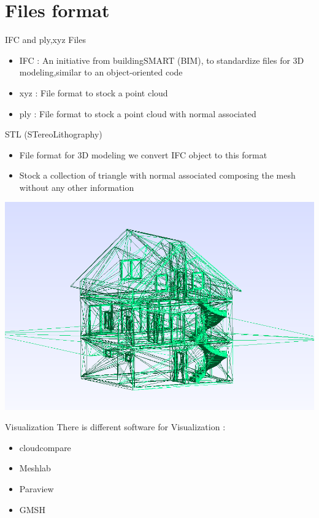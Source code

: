 \documentclass[10pt]{beamer}
\begin{document}
\section{Files format}
\begin{frame}{IFC and ply,xyz Files}
\begin{itemize}
    \item IFC : An initiative from buildingSMART (BIM), to standardize files for 3D modeling,similar to  an object-oriented code 
    \item xyz : File format to stock a point cloud
    \item ply : File format to stock a point cloud with normal associated
\end{itemize}


\end{frame}
\begin{frame}{STL (STereoLithography)}
    \begin{itemize}
        \item File format for 3D modeling we convert IFC object to this format
        \item Stock a collection of triangle with normal associated composing  the mesh without any other information
    \end{itemize}
    \begin{center}
        \includegraphics[scale=0.3]{../../images/ACJASMINSTL.png}
    \end{center}
    
\end{frame}

\begin{frame}{Visualization}
    There is  different software for Visualization  :
    \begin{itemize}
        \item cloudcompare
        \item Meshlab
        \item Paraview
        \item GMSH
    \end{itemize}
    
\end{frame}
\end{document}
